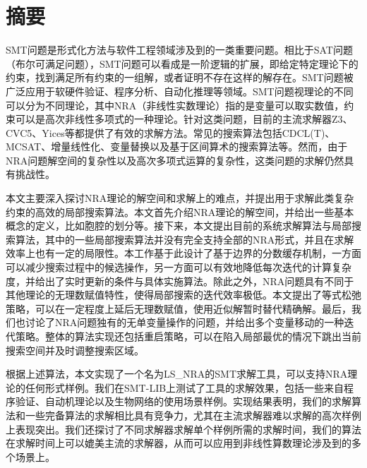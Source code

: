 \maketitle%
\MAKETITLE%
\makedeclaration%
\intobmk\chapter*{摘\quad 要}%
\setcounter{page}{1}%

SMT问题是形式化方法与软件工程领域涉及到的一类重要问题。相比于SAT问题（布尔可满足问题），SMT问题可以看成是一阶逻辑的扩展，即给定特定理论下的约束，找到满足所有约束的一组解，或者证明不存在这样的解存在。SMT问题被广泛应用于软硬件验证、程序分析、自动化推理等领域。SMT问题视理论的不同可以分为不同理论，其中NRA（非线性实数理论）指的是变量可以取实数值，约束可以是高次非线性多项式的一种理论。针对这类问题，目前的主流求解器Z3、CVC5、Yices等都提供了有效的求解方法。常见的搜索算法包括CDCL(T)、MCSAT、增量线性化、变量替换以及基于区间算术的搜索算法等。然而，由于NRA问题解空间的复杂性以及高次多项式运算的复杂性，这类问题的求解仍然具有挑战性。

本文主要深入探讨NRA理论的解空间和求解上的难点，并提出用于求解此类复杂约束的高效的局部搜索算法。本文首先介绍NRA理论的解空间，并给出一些基本概念的定义，比如胞腔的划分等。接下来，本文提出目前的系统求解算法与局部搜索算法，其中的一些局部搜索算法并没有完全支持全部的NRA形式，并且在求解效率上也有一定的局限性。本工作基于此设计了基于边界的分数缓存机制，一方面可以减少搜索过程中的候选操作，另一方面可以有效地降低每次迭代的计算复杂度，并给出了实时更新的条件与具体实施算法。除此之外，NRA问题具有不同于其他理论的无理数赋值特性，使得局部搜索的迭代效率极低。本文提出了等式松弛策略，可以在一定程度上延后无理数赋值，使用近似解暂时替代精确解。最后，我们也讨论了NRA问题独有的无单变量操作的问题，并给出多个变量移动的一种迭代策略。整体的算法实现还包括重启策略，可以在陷入局部最优的情况下跳出当前搜索空间并及时调整搜索区域。

根据上述算法，本文实现了一个名为LS\_NRA的SMT求解工具，可以支持NRA理论的任何形式样例。我们在SMT-LIB上测试了工具的求解效果，包括一些来自程序验证、自动机理论以及生物网络的使用场景样例。实现结果表明，我们的求解算法和一些完备算法的求解相比具有竞争力，尤其在主流求解器难以求解的高次样例上表现突出。我们还探讨了不同求解器求解单个样例所需的求解时间，我们的算法在求解时间上可以媲美主流的求解器，从而可以应用到非线性算数理论涉及到的多个场景上。


